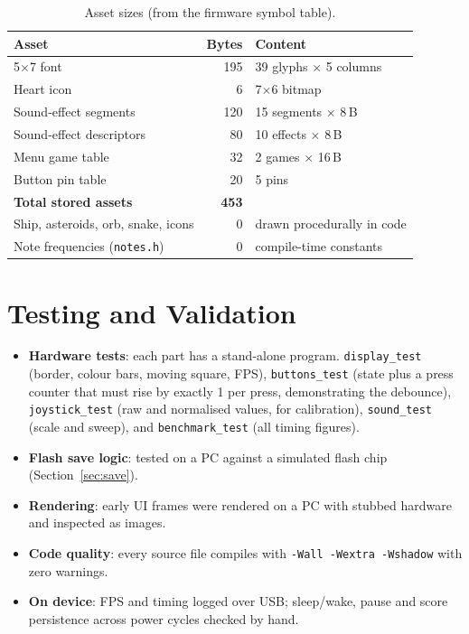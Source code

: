 \documentclass[11pt,a4paper]{article}
\newcommand{\file}[1]{\texttt{#1}}
\begin{document}
\begin{table}[H]
\centering
\caption{Asset sizes (from the firmware symbol table).}\label{tab:assets}
\begin{tabular}{lrl}
\toprule
\textbf{Asset} & \textbf{Bytes} & \textbf{Content} \\
\midrule
5$\times$7 font & 195 & 39 glyphs $\times$ 5 columns \\
Heart icon & 6 & 7$\times$6 bitmap \\
Sound-effect segments & 120 & 15 segments $\times$ 8\,B \\
Sound-effect descriptors & 80 & 10 effects $\times$ 8\,B \\
Menu game table & 32 & 2 games $\times$ 16\,B \\
Button pin table & 20 & 5 pins \\
\textbf{Total stored assets} & \textbf{453} & \\
\midrule
Ship, asteroids, orb, snake, icons & 0 & drawn procedurally in code \\
Note frequencies (\file{notes.h}) & 0 & compile-time constants \\
\bottomrule
\end{tabular}
\end{table}

\section{Testing and Validation}
\begin{itemize}
  \item \textbf{Hardware tests}: each part has a stand-alone program.
        \texttt{display\_test} (border, colour bars, moving square, FPS),
        \texttt{buttons\_test} (state plus a press counter that must rise by
        exactly 1 per press, demonstrating the debounce), \texttt{joystick\_test}
        (raw and normalised values, for calibration), \texttt{sound\_test}
        (scale and sweep), and \texttt{benchmark\_test} (all timing figures).
  \item \textbf{Flash save logic}: tested on a PC against a simulated flash chip
        (Section~\ref{sec:save}).
  \item \textbf{Rendering}: early UI frames were rendered on a PC with stubbed
        hardware and inspected as images.
  \item \textbf{Code quality}: every source file compiles with
        \texttt{-Wall -Wextra -Wshadow} with zero warnings.
  \item \textbf{On device}: FPS and timing logged over USB; sleep/wake, pause and
        score persistence across power cycles checked by hand.
\end{itemize}
\end{document}
